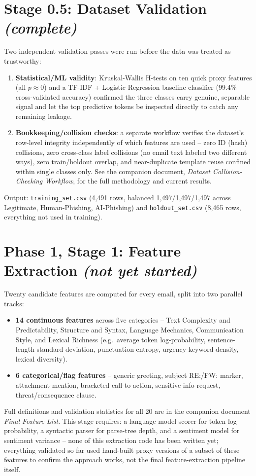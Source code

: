 \documentclass[11pt]{article}
\begin{document}
\section{Stage 0.5: Dataset Validation \textit{(complete)}}
Two independent validation passes were run before the data was treated as trustworthy:
\begin{enumerate}
\item \textbf{Statistical/ML validity}: Kruskal-Wallis H-tests on ten quick proxy features (all
$p \approx 0$) and a TF-IDF + Logistic Regression baseline classifier (99.4\% cross-validated accuracy)
confirmed the three classes carry genuine, separable signal and let the top predictive tokens be
inspected directly to catch any remaining leakage.
\item \textbf{Bookkeeping/collision checks}: a separate workflow verifies the dataset's row-level
integrity independently of which features are used -- zero ID (hash) collisions, zero cross-class label
collisions (no email text labeled two different ways), zero train/holdout overlap, and near-duplicate
template reuse confined within single classes only. See the companion document,
\textit{Dataset Collision-Checking Workflow}, for the full methodology and current results.
\end{enumerate}
Output: \texttt{training\_set.csv} (4{,}491 rows, balanced 1{,}497/1{,}497/1{,}497 across Legitimate,
Human-Phishing, AI-Phishing) and \texttt{holdout\_set.csv} (8{,}465 rows, everything not used in
training).

\section{Phase 1, Stage 1: Feature Extraction \textit{(not yet started)}}
Twenty candidate features are computed for every email, split into two parallel tracks:
\begin{itemize}
\item \textbf{14 continuous features} across five categories -- Text Complexity and Predictability,
Structure and Syntax, Language Mechanics, Communication Style, and Lexical Richness (e.g.\ average token
log-probability, sentence-length standard deviation, punctuation entropy, urgency-keyword density,
lexical diversity).
\item \textbf{6 categorical/flag features} -- generic greeting, subject RE:/FW: marker,
attachment-mention, bracketed call-to-action, sensitive-info request, threat/consequence clause.
\end{itemize}
Full definitions and validation statistics for all 20 are in the companion document
\textit{Final Feature List}. This stage requires: a language-model scorer for token log-probability, a
syntactic parser for parse-tree depth, and a sentiment model for sentiment variance -- none of this
extraction code has been written yet; everything validated so far used hand-built proxy versions of a
subset of these features to confirm the approach works, not the final feature-extraction pipeline itself.
\end{document}

